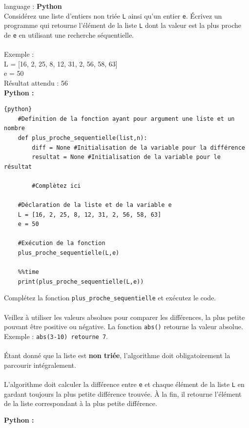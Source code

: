 \begin{Exercice}[10 minutes] language : \textbf{Python}\\

Considérez une liste d’entiers non triée \lstinline{L} ainsi qu’un entier \lstinline{e}. Écrivez un programme qui retourne l'élément de la liste \lstinline{L} dont la valeur est la plus proche de \lstinline{e} en utilisant une recherche séquentielle.\\\\
Exemple :\\
L = [16, 2, 25, 8, 12, 31, 2, 56, 58, 63]\\
e = 50\\
Résultat attendu : 56\\
\textbf{Python :}
\begin{lstlisting}{python}
    #Definition de la fonction ayant pour argument une liste et un nombre 
    def plus_proche_sequentielle(list,n):
        diff = None #Initialisation de la variable pour la différence
        resultat = None #Initialisation de la variable pour le résultat
    
        #Complètez ici
        
    #Déclaration de la liste et de la variable e
    L = [16, 2, 25, 8, 12, 31, 2, 56, 58, 63] 
    e = 50

    #Exécution de la fonction
    plus_proche_sequentielle(L,e)
    
    %%time 
    print(plus_proche_sequentielle(L,e))

\end{lstlisting}

    \begin{conseil}
        Complétez la fonction \lstinline{plus_proche_sequentielle} et exécutez le code.\\\\
        Veillez à utiliser les valeurs absolues pour comparer les différences, la plus petite pouvant être positive ou négative. La fonction \lstinline{abs()} retourne la valeur absolue. Exemple : \lstinline{abs(3-10) retourne 7}.\\\\
        Étant donné que la liste est \textbf{non triée}, l'algorithme doit obligatoirement la parcourir intégralement.\\\\
        L'algorithme doit calculer la différence entre \lstinline{e} et chaque élément de la liste \lstinline{L} en gardant toujours la plus petite différence trouvée. À la fin, il retourne l'élément de la liste correspondant à la plus petite différence.  
    \end{conseil}
    
    \begin{solution}
    \textbf{Python :}
        
        
    \end{solution}
    
\end{Exercice}

